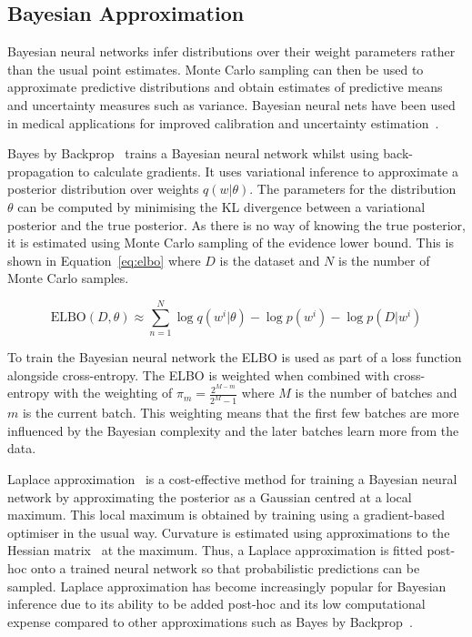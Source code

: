 \subsection{Bayesian Approximation}
\label{subsec:bayesian_calibration}
Bayesian neural networks infer distributions over their weight parameters rather than the usual point estimates. Monte Carlo sampling can then be used to approximate predictive distributions and obtain estimates of predictive means and uncertainty measures such as variance. Bayesian neural nets have been used in medical applications for improved calibration and uncertainty estimation~\citep{kwon2020uncertainty}.

Bayes by Backprop~\citep{blundell2015weight} trains a Bayesian neural network whilst using back-propagation to calculate gradients. It uses variational inference to approximate a posterior distribution over weights $q(w|\theta)$. The parameters for the distribution $\theta$ can be computed by minimising the KL divergence between a variational posterior and the true posterior. As there is no way of knowing the true posterior, it is estimated using Monte Carlo sampling of the evidence lower bound. This is shown in Equation~\ref{eq:elbo} where $D$ is the dataset and $N$ is the number of Monte Carlo samples.

\begin{equation}
	\text{ELBO}(D, \theta) \approx \sum^N_{n=1}\log q(w^i|\theta)-\log p(w^i) - \log p(D|w^i)
	\label{eq:elbo}
\end{equation}

To train the Bayesian neural network the ELBO is used as part of a loss function alongside cross-entropy. The ELBO is weighted when combined with cross-entropy with the weighting of $\pi_m = \frac{2^{M-m}}{2^M-1}$ where $M$ is the number of batches and $m$ is the current batch. This weighting means that the first few batches are more influenced by the Bayesian complexity and the later batches learn more from the data.

Laplace approximation~\citep{mackay1992bayesian} is a cost-effective method for training a Bayesian neural network by approximating the posterior as a Gaussian centred at a local maximum. This local maximum is obtained by training using a gradient-based optimiser in the usual way. Curvature is estimated using approximations to the Hessian matrix~\citep{botev2017practical} at the maximum. Thus, a Laplace approximation is fitted post-hoc onto a trained neural network so that probabilistic predictions can be sampled. Laplace approximation has become increasingly popular for Bayesian inference due to its ability to be added post-hoc and its low computational expense compared to other approximations such as Bayes by Backprop~\citep{daxberger2021laplace}.



